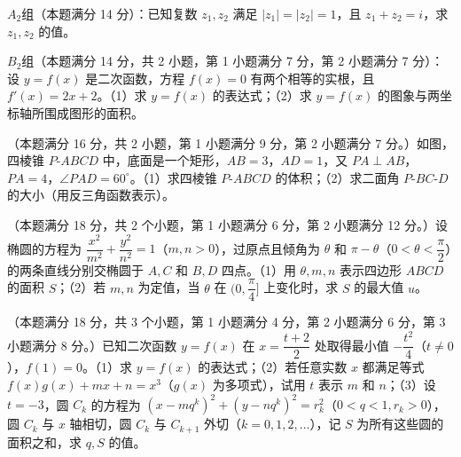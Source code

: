 \begin{question}

$A_2$组（本题满分 14 分）：已知复数 $z_1,z_2$ 满足 $|z_1|=|z_2|=1$，且 $z_1+z_2=i$，求 $z_1,z_2$ 的值。

$B_2$组（本题满分 14 分，共 2 小题，第 1 小题满分 7 分，第 2 小题满分 7 分）：设 $y=f(x)$ 是二次函数，方程 $f(x)=0$ 有两个相等的实根，且 $f'(x)=2x+2$。（1）求 $y=f(x)$ 的表达式；（2）求 $y=f(x)$ 的图象与两坐标轴所围成图形的面积。

\Needspace{0.4\textheight}
\end{question}
\begin{question}
（本题满分 16 分，共 2 小题，第 1 小题满分 9 分，第 2 小题满分 7 分。）如图，四棱锥 $P\text{-}ABCD$ 中，底面是一个矩形，$AB=3$，$AD=1$，又 $PA\perp AB$，$PA=4$，$\angle PAD=60^\circ$。（1）求四棱锥 $P\text{-}ABCD$ 的体积；（2）求二面角 $P\text{-}BC\text{-}D$ 的大小（用反三角函数表示）。
\nopagebreak[4]
\begin{center}\end{center}
\nopagebreak[4]
\end{question}
\begin{question}
（本题满分 18 分，共 2 个小题，第 1 小题满分 6 分，第 2 小题满分 12 分。）设椭圆的方程为 $\dfrac{x^2}{m^2}+\dfrac{y^2}{n^2}=1$（$m,n>0$），过原点且倾角为 $\theta$ 和 $\pi-\theta$（$0<\theta<\dfrac\pi2$）的两条直线分别交椭圆于 $A,C$ 和 $B,D$ 四点。（1）用 $\theta,m,n$ 表示四边形 $ABCD$ 的面积 $S$；（2）若 $m,n$ 为定值，当 $\theta$ 在 $(0,\dfrac\pi4]$ 上变化时，求 $S$ 的最大值 $u$。

\end{question}
\begin{question}
（本题满分 18 分，共 3 个小题，第 1 小题满分 4 分，第 2 小题满分 6 分，第 3 小题满分 8 分。）已知二次函数 $y=f(x)$ 在 $x=\dfrac{t+2}{2}$ 处取得最小值 $-\dfrac{t^2}{4}$（$t\ne0$），$f(1)=0$。（1）求 $y=f(x)$ 的表达式；（2）若任意实数 $x$ 都满足等式 $f(x)g(x)+mx+n=x^3$（$g(x)$ 为多项式），试用 $t$ 表示 $m$ 和 $n$；（3）设 $t=-3$，圆 $C_k$ 的方程为 $(x-mq^k)^2+(y-nq^k)^2=r_k^2$（$0<q<1,r_k>0$），圆 $C_k$ 与 $x$ 轴相切，圆 $C_k$ 与 $C_{k+1}$ 外切（$k=0,1,2,\ldots$），记 $S$ 为所有这些圆的面积之和，求 $q,S$ 的值。

\end{question}